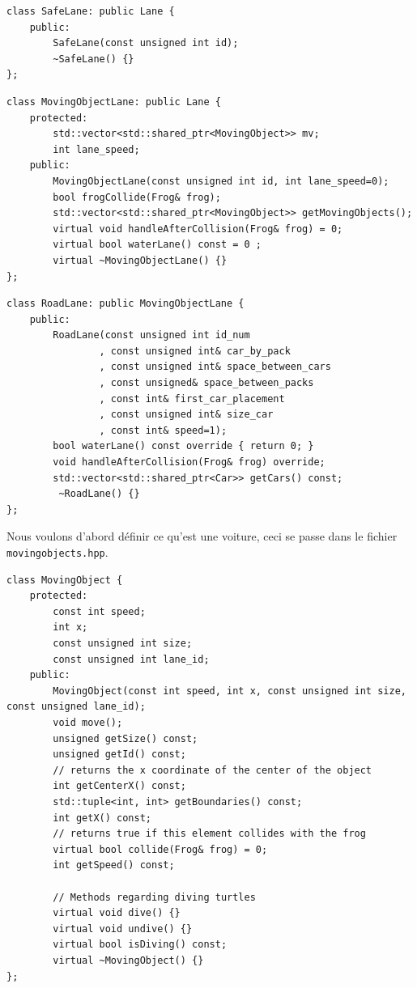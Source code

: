 \documentclass[a4paper, 12pt]{article}
\begin{document}
\begin{lstlisting}
class SafeLane: public Lane {
    public:
        SafeLane(const unsigned int id);
        ~SafeLane() {}
};
\end{lstlisting}

\begin{lstlisting}
class MovingObjectLane: public Lane {
    protected:
        std::vector<std::shared_ptr<MovingObject>> mv;
        int lane_speed;
    public:
        MovingObjectLane(const unsigned int id, int lane_speed=0);
        bool frogCollide(Frog& frog);
        std::vector<std::shared_ptr<MovingObject>> getMovingObjects();
        virtual void handleAfterCollision(Frog& frog) = 0;
        virtual bool waterLane() const = 0 ;
        virtual ~MovingObjectLane() {}
};
\end{lstlisting}

\begin{lstlisting}
class RoadLane: public MovingObjectLane {
    public:
        RoadLane(const unsigned int id_num
                , const unsigned int& car_by_pack
                , const unsigned int& space_between_cars
                , const unsigned& space_between_packs
                , const int& first_car_placement
                , const unsigned int& size_car
                , const int& speed=1);
        bool waterLane() const override { return 0; }
        void handleAfterCollision(Frog& frog) override;
        std::vector<std::shared_ptr<Car>> getCars() const;
         ~RoadLane() {}
};
\end{lstlisting}

Nous voulons d'abord définir ce qu'est une voiture, 
ceci se passe dans le fichier \texttt{movingobjects.hpp}. 

\begin{lstlisting}
class MovingObject {
    protected:
        const int speed;
        int x;
        const unsigned int size;
        const unsigned int lane_id;
    public:
        MovingObject(const int speed, int x, const unsigned int size, const unsigned lane_id);
        void move();
        unsigned getSize() const;
        unsigned getId() const;
        // returns the x coordinate of the center of the object
        int getCenterX() const;
        std::tuple<int, int> getBoundaries() const;
        int getX() const;
        // returns true if this element collides with the frog
        virtual bool collide(Frog& frog) = 0;
        int getSpeed() const;
      
        // Methods regarding diving turtles
        virtual void dive() {}
        virtual void undive() {}
        virtual bool isDiving() const;
        virtual ~MovingObject() {}
};
\end{lstlisting}
\end{document}
